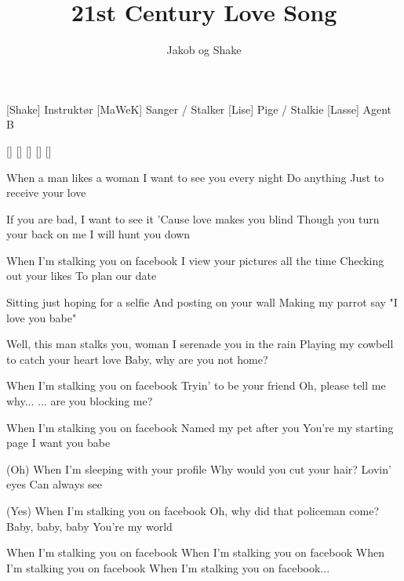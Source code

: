 \documentclass[a4paper,11pt]{article}
\title{21st Century Love Song}
\author{Jakob og Shake}
\begin{document}
\maketitle

\begin{roles}
[Shake] Instruktør
[MaWeK] Sanger / Stalker
[Lise] Pige / Stalkie
[Lasse] Agent B
\end{roles}

\begin{props}
[]
[]
[]
[]
[]
\end{props}

\begin{song}
 When a man likes a woman
I want to see you every night
Do anything
Just to receive your love

If you are bad, I want to see it
'Cause love makes you blind
Though you turn your back on me
I will hunt you down

When I'm stalking you on facebook
I view your pictures all the time
Checking out your likes
To plan our date

Sitting just hoping for a selfie
And posting on your wall
Making my parrot say
"I love you babe"

Well, this man stalks you, woman
I serenade you in the rain
Playing my cowbell to catch your heart love
Baby, why are you not home?

When I'm stalking you on facebook
Tryin' to be your friend
Oh, please tell me why...
... are you blocking me?

When I'm stalking you on facebook
Named my pet after you
You're my starting page
I want you babe

(Oh) When I'm sleeping with your profile
Why would you cut your hair?
Lovin' eyes
Can always see

(Yes) When I'm stalking you on facebook
Oh, why did that policeman come?
Baby, baby, baby
You're my world

When I'm stalking you on facebook
When I'm stalking you on facebook
When I'm stalking you on facebook
When I'm stalking you on facebook...
\end{song}
\end{document}
